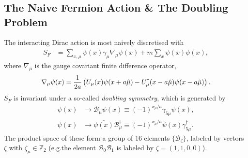 \subsection{The Naive Fermion Action \& The Doubling Problem}

The interacting Dirac action is most naively discretised with
\begin{align}
  S_F &= \sum_{x,\mu} \bar{\psi}(x) \gamma_{\mu} \nabla_{\mu} \psi(x) + m\sum_x \bar{\psi}(x) \psi(x),
  \label{eq:naivefermions}
\end{align}
where $\nabla_{\mu}$ is the gauge covariant finite difference operator,
\begin{align}
  \nabla_{\mu} \psi(x) = {1\over 2a} \left( U_{\mu} (x) \psi(x+a\hat{\mu}) - U^{\dagger}_{\mu}(x-a\hat{\mu})\psi(x-a\hat{\mu}) \right).
  \label{eq:lat_derivative}
\end{align}
$S_F$ is invariant under a so-called {\it{doubling symmetry}}, which is generated by
\begin{align}
  \label{eq:doublingsymmetry}
  \psi(x) & \to \mathcal{B}_{\mu} \psi(x) \equiv  (-1)^{x_{\mu}/a} \gamma_{5\mu} \psi(x), \\
  \bar{\psi}(x) & \to \bar{\psi(x)}\mathcal{B}^{\dagger}_{\mu} \equiv (-1)^{x_{\mu}/a} \bar{\psi}(x) \gamma^{\dagger}_{5\mu}.
\end{align}
The product space of these form a group of 16 elements $\{\mathcal{B}_{\zeta}\}$, labeled by vectors $\zeta$ with $\zeta_{\mu}\in \mathbb{Z}_2$ (e.g.the element $\mathcal{B}_{0}\mathcal{B}_{1}$ is labeled by $\zeta=(1,1,0,0)$).

